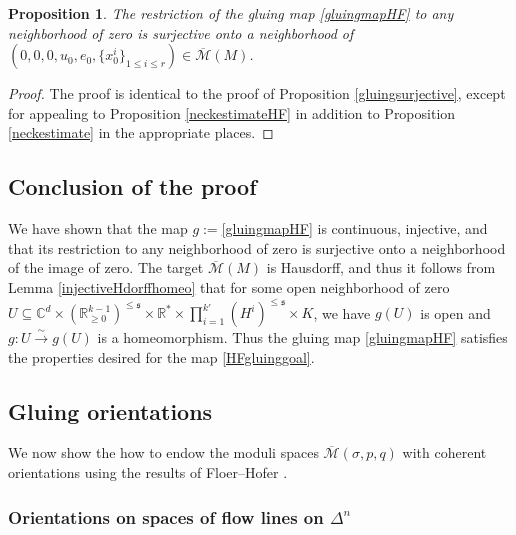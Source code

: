 \documentclass[12pt]{article}
\newtheorem{proposition}[theorem]{Proposition}
\theoremstyle{definition}
\theoremstyle{remark}
\numberwithin{equation}{subsection}
\newcommand{\s}{\mathfrak s}
\newcommand{\CC}{\mathbb C}
\newcommand{\RR}{\mathbb R}
\newcommand{\Mbar}{\overline{\mathcal M}}
\begin{document}
\begin{proposition}\label{gluingsurjectiveHF}
The restriction of the gluing map \eqref{gluingmapHF} to any neighborhood of zero is surjective onto a neighborhood of $(0,0,0,u_0,e_0,\{x^i_0\}_{1\leq i\leq r})\in\Mbar(M)$.
\end{proposition}

\begin{proof}
The proof is identical to the proof of Proposition \ref{gluingsurjective}, except for appealing to Proposition \ref{neckestimateHF} in addition to Proposition \ref{neckestimate} in the appropriate places.
\end{proof}

\subsection{Conclusion of the proof}

We have shown that the map $g:=$\eqref{gluingmapHF} is continuous, injective, and that its restriction to any neighborhood of zero is surjective onto a neighborhood of the image of zero.  The target $\Mbar(M)$ is Hausdorff, and thus it follows from Lemma \ref{injectiveHdorffhomeo} that for some open neighborhood of zero $U\subseteq\CC^d\times(\RR_{\geq 0}^{k-1})^{\leq\s}\times\RR^\ast\times\prod_{i=1}^{k\prime}(H^i)^{\leq\s}\times K$, we have $g(U)$ is open and $g:U\xrightarrow\sim g(U)$ is a homeomorphism.  Thus the gluing map \eqref{gluingmapHF} satisfies the properties desired for the map \eqref{HFgluinggoal}.

\subsection{Gluing orientations}

We now show the how to endow the moduli spaces $\Mbar(\sigma,p,q)$ with coherent orientations using the results of Floer--Hofer \cite{floerhoferorientations}.

\subsubsection{Orientations on spaces of flow lines on $\Delta^n$}\label{simplexflowsorsec}
\end{document}
